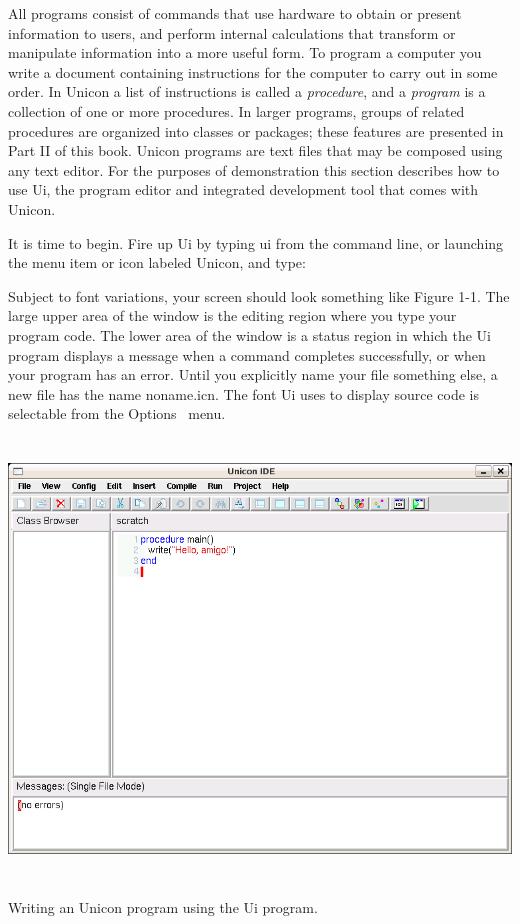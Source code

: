 All programs consist of commands that use hardware to obtain or present
information to users, and perform internal calculations that transform
or manipulate information into a more useful form. To program a
computer you write a document containing instructions for the computer
to carry out in some order. In Unicon a list of instructions is called
a \textit{procedure}, and a
\textit{program} is a collection of one or more
procedures. In larger programs, groups of related procedures are
organized into classes or packages; these features are presented in
Part II of this book. Unicon programs are text files that may be
composed using any text editor. For the purposes of
demonstration this section describes how to use Ui, the
program editor and integrated development tool that comes with Unicon.

It is time to begin. Fire up Ui by typing
{\textquotedbl}ui{\textquotedbl} from the command line, or launching
the menu item or icon labeled {\textquotedbl}Unicon,{\textquotedbl} and
type:


Subject to font variations, your screen should look
something like Figure 1-1. The large upper area of the window is the
editing region where you type your program code. The lower area of the
window is a status region in which the Ui program displays a message
when a command completes successfully, or when your program has an
error. Until you explicitly name your file something else, a new file
has the name \textsf{noname.icn}. The font Ui uses to display
source code is selectable from the Options \ menu.

\begin{center}
\includegraphics[width=6in,height=4.5953in]{ub-img/ub-img5.png}
\end{center}
\vspace{-0.25cm}{\sffamily\bfseries Figure 1-1:}
{\sffamily Writing an Unicon program using the Ui program.}

